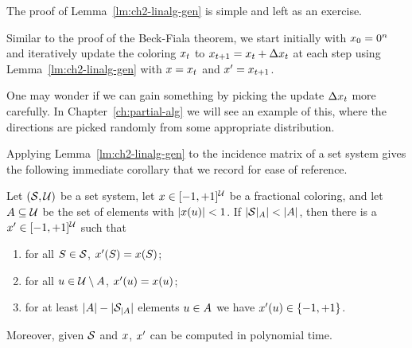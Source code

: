 
The proof of Lemma~\ref{lm:ch2-linalg-gen} is simple and left as an exercise.

Similar to the proof of the Beck-Fiala theorem, we start initially with $x_0= 0^n$ and iteratively update the coloring $x_t$ to $x_{t+1}= x_t + \Delta x_t$ at each step using Lemma~\ref{lm:ch2-linalg-gen} with $x=x_t$ and $x'=x_{t+1}$.


One may wonder if we can gain something by picking the update $\Delta x_t$ more carefully. In Chapter~\ref{ch:partial-alg} we will see an example of this, where the directions are picked randomly from some appropriate distribution.

Applying Lemma~\ref{lm:ch2-linalg-gen}  to the incidence matrix of
a set system gives the following immediate corollary that we record for ease of reference.

\begin{lemma}\label{lm:ch2-fewsets}
  Let \((\mathcal{S}, \mathcal{U})\) be a set system, let \(x\in [-1,+1]^{\mathcal{U}}\) be a
  fractional coloring, and let
  \(A \subseteq \mathcal{U}\) be the set of elements with \(|x(u)| < 1\). If \(|\mathcal{S}|_{A}| < |A|\), then there is a \(x' \in [-1,+1]^{\mathcal{U}}\) such that
  \begin{enumerate}
  \item for all \(S \in \mathcal{S}\), \(x'(S) = x(S)\);%
  \item for all \(u \in \mathcal{U}\setminus A\), \(x'(u) = x(u)\);%
  \item for at least \(|A|-|\mathcal{S}_{|A}|\) elements \(u \in
    A\) we have
    \(x'(u) \in \{-1,+1\}\).%
  \end{enumerate}
  Moreover, given \(\mathcal{S}\) and \(x\), \(x'\) can be computed in
  polynomial time.
\end{lemma}

